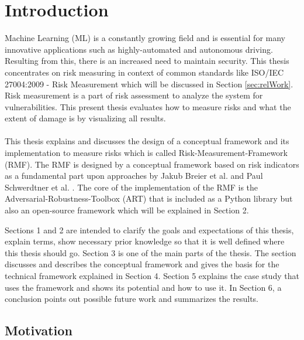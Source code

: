 \section{Introduction}
\label{sec:intro}

Machine Learning (ML) is a constantly growing field and is essential for many innovative applications such as highly-automated and autonomous driving. Resulting from this,
there is an increased need to maintain security. This thesis concentrates on risk measuring in context of common standards like ISO/IEC 27004:2009 - Risk Measurement which will be
discussed in Section \ref{sec:relWork}. Risk measurement is a part of risk assessment to analyze the system for vulnerabilities. This present thesis evaluates how to measure risks and what the
extent of damage is by visualizing all results. \\ \\
This thesis explains and discusses the design of a conceptual framework and its implementation to measure risks which is called Risk-Measurement-Framework (RMF). The RMF is designed by a
conceptual framework based on risk indicators as a fundamental part upon approaches by Jakub Breier et al. \cite{DBLP:journals/corr/abs-2012-04884} and Paul Schwerdtner et al.
\cite{DBLP:journals/corr/abs-2011-04328}. The core of the implementation of the RMF is the Adversarial-Robustness-Toolbox (ART) that is included as a Python library but also an open-source
framework which will be explained in Section 2.

Sections 1 and 2 are intended to clarify the goals and expectations of this thesis, explain terms, show necessary prior knowledge so that it is well defined where this thesis should go.
Section 3 is one of the main parts of the thesis. The section discusses and describes the conceptual framework and gives the basis for the technical framework explained in Section 4.
Section 5 explains the case study that uses the framework and shows its potential and how to use it. In Section 6, a conclusion points out possible future work and summarizes the results.

\subsection{Motivation}


